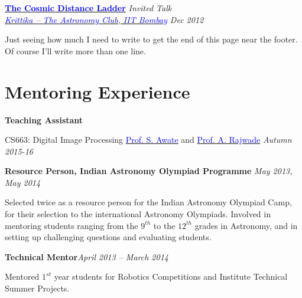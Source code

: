 \documentclass[margin,line]{res}
\newenvironment{list1}{
  \begin{list}{\ding{113}}{%
      \setlength{\itemsep}{0in}
      \setlength{\parsep}{0in} \setlength{\parskip}{0in}
      \setlength{\topsep}{0in} \setlength{\partopsep}{0in} 
      \setlength{\leftmargin}{0.17in}}}{\end{list}}
\begin{document}
\begin{resume}
{\bf \href{http://www.stab-iitb.org/krittika/the-cosmic-ladder-distance}{\textcolor{blue} {The Cosmic Distance Ladder}}} \hfill {\em Invited Talk} \\
{\em \href{www.stab-iitb.org/krittika}{\textcolor{blue} {Krittika -- The Astronomy Club, IIT Bombay}} \hfill Dec 2012} \\
\vspace*{-.15in}
\begin{list1}
\item[] Just seeing how much I need to write to get the end of this page near the footer.\\
Of course I'll write more than one line.
\end{list1}


\section{\sc Mentoring Experience}
\textbf{Teaching Assistant}
\begin{list1}
\item[]CS663: Digital Image Processing \hspace{0.5cm} \href{https://www.cse.iitb.ac.in/~suyash}{\textcolor{blue}{Prof. S. Awate}} and \href{https://www.cse.iitb.ac.in/~ajitvr}{\textcolor{blue}{Prof. A. Rajwade}} \hfill{\textit{Autumn 2015-16}}
\end{list1}

\vspace*{-0.1in}

\textbf{Resource Person, Indian Astronomy Olympiad Programme} \hfill \textit{May 2013, May 2014} \\
\vspace*{-.15in}
\begin{list1}
\item[] Selected twice as a resource person for the Indian Astronomy Olympiad Camp, for their selection to the international Astronomy Olympiads. Involved in mentoring students ranging from the $9^{th}$ to the $12^{th}$ grades in Astronomy, and in setting up challenging questions and evaluating students.
\end{list1}

\vspace*{-0.1in}

\textbf{Technical Mentor}\hfill \textit{April 2013 -- March 2014} \\
\vspace*{-.15in}
\begin{list1}
\item[] Mentored $1^{st}$ year students for Robotics Competitions and Institute Technical Summer Projects.
\end{list1}


\end{resume}
\end{document}
